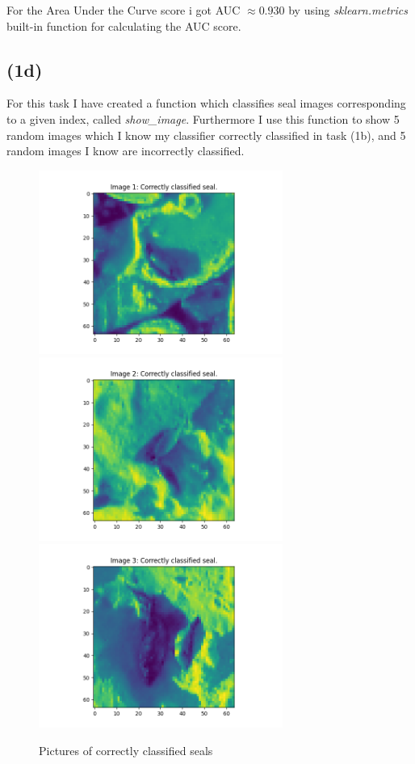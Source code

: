 \documentclass[12pt, letterpaper]{article}
\begin{document}
      \noindent For the Area Under the Curve score i got AUC $ \approx \underline{0.930}$ by using \textit{sklearn.metrics} built-in function for calculating the AUC score.
    \subsection*{(1d)}
      For this task I have created a function which classifies seal images corresponding to a given index, called \textit{show\_image}. Furthermore I use this function to show 5 random images which I know my classifier correctly classified in task (1b), and 5 random images I know are incorrectly classified.
      \begin{figure}[H]
        \caption{Pictures of correctly classified seals}
        \centering
        \includegraphics[width=8cm]{corr1}
        \includegraphics[width=8cm]{corr2}
        \includegraphics[width=8cm]{corr3}

\end{figure}
\end{document}
